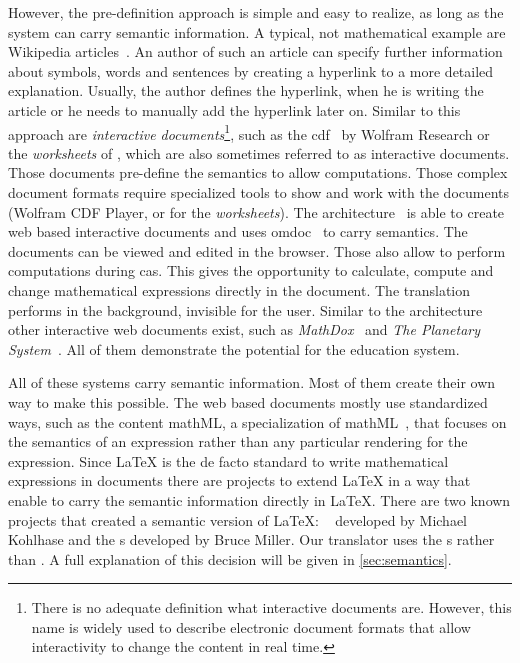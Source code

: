 However, the pre-definition approach is simple and easy to realize, as long as the system can carry semantic information. A typical, not mathematical example are Wikipedia articles~\parencite{Wiki}. An author of such an article can specify further information about symbols, words and sentences by creating a hyperlink to a more detailed explanation. Usually, the author defines the hyperlink, when he is writing the article or he needs to manually add the hyperlink later on. Similar to this approach are \textit{interactive documents}\footnote{There is no adequate definition what interactive documents are. However, this name is widely used to describe electronic document formats that allow interactivity to change the content in real time.}, such as the \gls{cdf}~\parencite{CDF:Wolfram} by Wolfram Research or the \textit{worksheets} of \Maple{}, which are also sometimes referred to as interactive documents. Those documents pre-define the semantics to allow computations. Those complex document formats require specialized tools to show and work with the documents (Wolfram CDF Player, or \Maple{} for the \textit{worksheets}). The \JOBAD{} architecture~\parencite{JOBAD:orig} is able to create web based interactive documents and uses \gls{omdoc}~\parencite{OMDoc} to carry semantics. The documents can be viewed and edited in the browser. Those  also allow to perform computations during \gls{cas}. This gives the opportunity to calculate, compute and change mathematical expressions directly in the document. The translation performs in the background, invisible for the user. Similar to the \JOBAD{} architecture other interactive web documents exist, such as \textit{MathDox}~\parencite{MathDox} and \textit{The Planetary System}~\parencite{Planetary}. All of them demonstrate the potential for the education system.

All of these systems carry semantic information. Most of them create their own way to make this possible. The web based documents mostly use standardized ways, such as the content \gls{mathML}, a specialization of \gls{mathML}~\parencite{MathML}, that focuses on the semantics of an expression rather than any particular rendering for the expression. Since \LaTeX{} is the de facto standard to write mathematical expressions in documents there are projects to extend \LaTeX{} in a way that enable to carry the semantic information directly in \LaTeX. There are two known projects that created a semantic version of \LaTeX: \sTeX{}~\parencite{sTeX} developed by Michael Kohlhase and the \Macro s developed by Bruce Miller. Our translator uses the \Macro s rather than \sTeX. A full explanation of this decision will be given in \cref{sec:semantics}.

